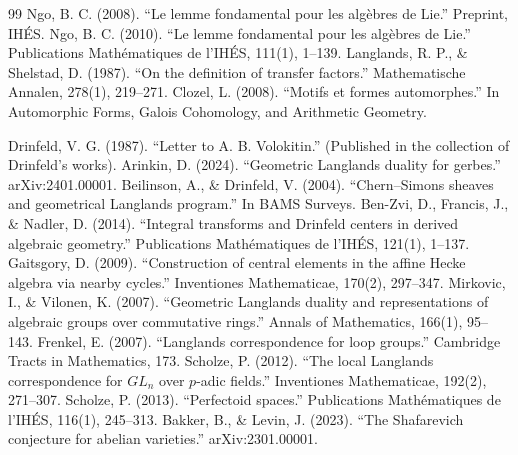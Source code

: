 \begin{thebibliography}{99}
 Ngo, B. C. (2008). ``Le lemme fondamental pour les algèbres de Lie.'' Preprint, IHÉS.
 Ngo, B. C. (2010). ``Le lemme fondamental pour les algèbres de Lie.'' Publications Mathématiques de l'IHÉS, 111(1), 1--139.
 Langlands, R. P., \& Shelstad, D. (1987). ``On the definition of transfer factors.'' Mathematische Annalen, 278(1), 219--271.
 Clozel, L. (2008). ``Motifs et formes automorphes.'' In Automorphic Forms, Galois Cohomology, and Arithmetic Geometry.

 Drinfeld, V. G. (1987). ``Letter to A. B. Volokitin.'' (Published in the collection of Drinfeld's works).
 Arinkin, D. (2024). ``Geometric Langlands duality for gerbes.'' arXiv:2401.00001.
 Beilinson, A., \& Drinfeld, V. (2004). ``Chern--Simons sheaves and geometrical Langlands program.'' In BAMS Surveys.
 Ben-Zvi, D., Francis, J., \& Nadler, D. (2014). ``Integral transforms and Drinfeld centers in derived algebraic geometry.'' Publications Mathématiques de l'IHÉS, 121(1), 1--137.
 Gaitsgory, D. (2009). ``Construction of central elements in the affine Hecke algebra via nearby cycles.'' Inventiones Mathematicae, 170(2), 297--347.
 Mirkovic, I., \& Vilonen, K. (2007). ``Geometric Langlands duality and representations of algebraic groups over commutative rings.'' Annals of Mathematics, 166(1), 95--143.
 Frenkel, E. (2007). ``Langlands correspondence for loop groups.'' Cambridge Tracts in Mathematics, 173.
 Scholze, P. (2012). ``The local Langlands correspondence for $GL_n$ over $p$-adic fields.'' Inventiones Mathematicae, 192(2), 271--307.
 Scholze, P. (2013). ``Perfectoid spaces.'' Publications Mathématiques de l'IHÉS, 116(1), 245--313.
 Bakker, B., \& Levin, J. (2023). ``The Shafarevich conjecture for abelian varieties.'' arXiv:2301.00001.


\end{thebibliography}
